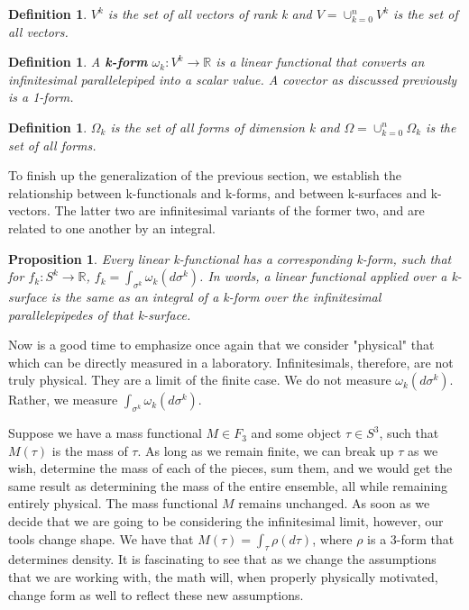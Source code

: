 \documentclass{book}
\newtheorem{defn}[equation]{Definition}
\newtheorem{prop}[equation]{Proposition}
\begin{document}
\begin{defn}
	$V^k$ is the set of all vectors of rank k and $V = \cup_{k=0}^n V^k$ is the set of all vectors. 
	\end{defn}
 

\begin{defn}
	A \textbf{k-form} $\omega_k : V^k \to \mathbb{R}$ is a linear functional that converts an infinitesimal parallelepiped into a scalar value. A covector as discussed previously is a 1-form. 
\end{defn}

\begin{defn}
	$\Omega_k$ is the set of all forms of dimension k and $\Omega = \cup_{k=0}^n\Omega_k$ is the set of all forms. 
\end{defn}



To finish up the generalization of the previous section, we establish the relationship between k-functionals and k-forms, and between k-surfaces and k-vectors. The latter two are infinitesimal variants of the former two, and are related to one another by an integral. 


\begin{prop}
	Every linear k-functional has a corresponding k-form, such that for $f_k : S^k \to \mathbb{R}$, $f_k = \int_{\sigma^k} \omega_k(d\sigma^k)$. In words, a linear functional applied over a k-surface is the same as an integral of a k-form over the infinitesimal parallelepipedes of that k-surface. 
\end{prop}

Now is a good time to emphasize once again that we consider "physical" that which can be directly measured in a laboratory. Infinitesimals, therefore, are not truly physical. They are a limit of the finite case. We do not measure $\omega_k(d\sigma^k)$. Rather, we measure $\int_{\sigma^k}\omega_k(d\sigma^k)$. 


Suppose we have a mass functional $M \in F_3$ and some object $\tau \in S^3$, such that $M(\tau)$ is the mass of $\tau$.  As long as we remain finite, we can break up $\tau$ as we wish, determine the mass of each of the pieces, sum them, and we would get the same result as determining the mass of the entire ensemble, all while remaining entirely physical. The mass functional $M$ remains unchanged. As soon as we decide that we are going to be considering the infinitesimal limit, however, our tools change shape. We have that $M(\tau) = \int_\tau \rho(d\tau)$, where $\rho$ is a 3-form that determines density. It is fascinating to see that as we change the assumptions that we are working with, the math will, when properly physically motivated, change form as well to reflect these new assumptions. 
\end{document}
